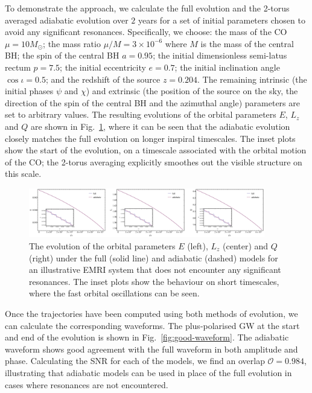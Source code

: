 \documentclass[aps,prd,amsfonts,amssymb,amsmath,nofootinbib,reprint,showpacs,superscriptaddress,twocolumn]{revtex4}
\newcommand{\figref}[1]{Fig.\ \ref{fig:#1}}
\begin{document}
To demonstrate the approach, we calculate the full evolution and the 2-torus averaged adiabatic evolution over $2$ years for a set of initial parameters chosen to avoid any significant resonances. Specifically, we choose: the mass of the CO $\mu = 10 M_{\odot}$; the mass ratio $\mu / M = 3\times 10^{-6}$ where $M$ is the mass of the central BH; the spin of the central BH $a=0.95$; the initial dimensionless semi-latus rectum $p=7.5$; the initial eccentricity $e=0.7$; the initial inclination angle $\cos \iota = 0.5$; and the redshift of the source $z=0.204$. The remaining intrinsic (the initial phases $\psi$ and $\chi$) and extrinsic (the position of the source on the sky, the direction of the spin of the central BH and the azimuthal angle) parameters are set to arbitrary values. The resulting evolutions of the orbital parameters $E$, $L_z$ and $Q$ are shown in \figref{good-traj}, where it can be seen that the adiabatic evolution closely matches the full evolution on longer inspiral timescales. The inset plots show the start of the evolution, on a timescale associated with the orbital motion of the CO; the 2-torus averaging explicitly smoothes out the visible structure on this scale.

\begin{figure}[htbp]
\centering
\includegraphics[width=0.92\textwidth]{Fig_good_traj}
\caption{\label{fig:good-traj}The evolution of the orbital parameters $E$ (left), $L_z$ (center) and $Q$ (right) under the full (solid line) and adiabatic (dashed) models for an illustrative EMRI system that does not encounter any significant resonances. The inset plots show the behaviour on short timescales, where the fast orbital oscillations can be seen.}
\end{figure}

Once the trajectories have been computed using both methods of evolution, we can calculate the corresponding waveforms. The plus-polarised GW at the start and end of the evolution is shown in \figref{good-waveform}. The adiabatic waveform shows good agreement with the full waveform in both amplitude and phase. Calculating the SNR for each of the models, we find an overlap $\mathcal{O} = 0.984$, illustrating that adiabatic models can be used in place of the full evolution in cases where resonances are not encountered.
\end{document}
